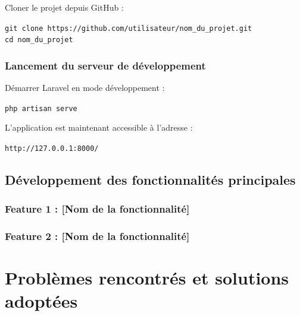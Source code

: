 Cloner le projet depuis GitHub :

\begin{tcolorbox}[colback=black, coltext=white, title=Clonage du projet, fonttitle=\bfseries]
\texttt{git clone https://github.com/utilisateur/nom\_du\_projet.git} \\
\texttt{cd nom\_du\_projet}
\end{tcolorbox}

\subsubsection{Lancement du serveur de développement}
Démarrer Laravel en mode développement :

\begin{tcolorbox}[colback=black, coltext=white, title=Lancement du serveur Laravel, fonttitle=\bfseries]
\texttt{php artisan serve}
\end{tcolorbox}

L’application est maintenant accessible à l’adresse :

\begin{tcolorbox}[colback=black, coltext=white, title=URL d’accès, fonttitle=\bfseries]
\texttt{http://127.0.0.1:8000/}
\end{tcolorbox}






\subsection{Développement des fonctionnalités principales}

\subsubsection{Feature 1 : [Nom de la fonctionnalité]}

\subsubsection{Feature 2 : [Nom de la fonctionnalité]}

\section{Problèmes rencontrés et solutions adoptées}
